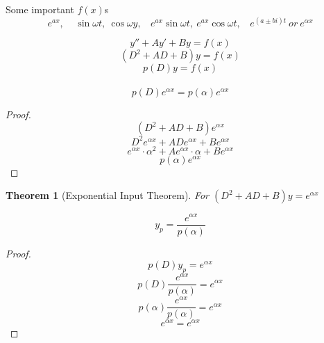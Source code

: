 \documentclass[12pt]{article}
\numberwithin{equation}{subsection}
\newtheorem{theorem}{Theorem}[section]
\begin{document}
Some important $f(x)$s
$$ e^{ax},\ \ \ \ \ \sin \omega t,\ \cos \omega y, \ \ \ \ e^{ax}\sin \omega t,\ e^{ax}\cos \omega t,\ \ \ \ e^{(a \pm bi)t}\ or\ e^{\alpha x}$$

\newpage
\begin{equation}
y''+Ay'+By=f(x) \tag{2.3.8}
\end{equation}
\begin{equation}
(D^2+AD+B)y=f(x)
\end{equation}
\begin{equation}
p(D)y=f(x)
\end{equation}\\

\begin{equation}
p(D)e^{\alpha x}= p(\alpha)e^{\alpha x}
\end{equation}

\begin{proof}
\begin{equation}
(D^2+AD+B)e^{\alpha x}
\end{equation}
\begin{equation}
D^2e^{\alpha x}+ADe^{\alpha x}+Be^{\alpha x}
\end{equation}
\begin{equation}
e^{\alpha x}\cdot \alpha^2+Ae^{\alpha x}\cdot \alpha +Be^{\alpha x}
\end{equation}
\begin{equation}
p(\alpha)e^{\alpha x}
\end{equation}
\end{proof}

\begin{theorem}[Exponential Input Theorem]
For $(D^2+AD+B)y=e^{\alpha x}$

\begin{equation}
y_p=\frac{e^{\alpha x}}{p(\alpha)}
\end{equation}
\end{theorem}

\begin{proof}
\begin{equation}
p(D)y_p=e^{\alpha x}
\end{equation}
\begin{equation}
p(D)\frac{e^{\alpha x}}{p(\alpha)}=e^{\alpha x}
\end{equation}
\begin{equation}
p(\alpha)\frac{e^{\alpha x}}{p(\alpha)}=e^{\alpha x}
\end{equation}
\begin{equation}
e^{\alpha x}=e^{\alpha x}
\end{equation}
\end{proof}
\end{document}
